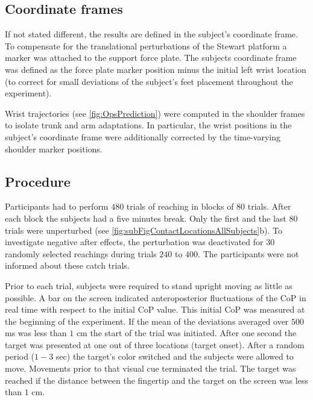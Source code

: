 \subsection{Coordinate frames}

If not stated different, the results are defined in the subject's coordinate
frame. To compensate for the translational perturbations of the Stewart platform
a marker was attached to the support force plate. The subjects coordinate frame
was defined as the force plate marker position minus the initial left wrist
location (to correct for small deviations of the subject's feet placement
throughout the experiment). 

Wrist trajectories (see \FigureAbbrP \ref{fig:OpsPrediction}) were computed in the shoulder frames to isolate
trunk and arm adaptations. In particular, the wrist positions in the subject's
coordinate frame were additionally corrected by the time-varying shoulder marker positions.  

\subsection{Procedure}

Participants had to perform $480$ trials of reaching in blocks of $80$ trials.
After each block the subjects had a five minutes break. Only the first and the
last $80$ trials were unperturbed (see \FigureAbbrP 
\ref{fig:subFigContactLocationsAllSubjects}b). To investigate
negative after effects, the perturbation was deactivated for $30$ randomly selected reachings  
during trials $240$ to $400$. The participants were not informed about these
catch trials. 

Prior to each trial, subjects were required to stand upright moving as little as
possible. A bar on the screen indicated anteroposterior fluctuations of the CoP
in real time with respect to the initial CoP value. This initial CoP was measured at the beginning of
the experiment. If the mean of the deviations averaged over $500$ ms was less
than $1$ cm the start of the trial was initiated. After one second the target
was presented at one out of three locations (target onset). After a random
period ($1-3$ sec) the target's color switched and the subjects were allowed to
move. Movements prior to that visual cue terminated the trial. The target was
reached if the distance between the fingertip and the target on the screen was
less than $1$ cm. 

